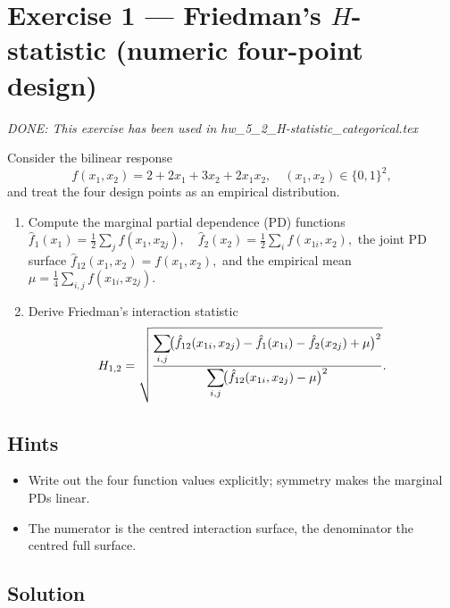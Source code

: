 \documentclass[a4paper]{article}
\begin{document}

\section*{Exercise 1 — Friedman's $H$-statistic (numeric four-point design)}
\label{ex:H_numeric}

\textit{DONE: This exercise has been used in hw\_5\_2\_H-statistic\_categorical.tex}

Consider the bilinear response
\[
f(x_1,x_2)=2+2x_1+3x_2+2x_1x_2,
\quad
(x_1,x_2)\in\{0,1\}^2,
\]
and treat the four design points as an empirical distribution.

\begin{enumerate}%
  \item Compute the marginal partial dependence (PD) functions
        \(
        \hat f_{1}(x_1)=\tfrac12\!\sum_{j}f(x_1,x_{2j}),
        \quad
        \hat f_{2}(x_2)=\tfrac12\!\sum_{i}f(x_{1i},x_2),
        \)
        the joint PD surface
        \(
        \hat f_{12}(x_1,x_2)=f(x_1,x_2),
        \)
        and the empirical mean
        \(
        \mu=\tfrac14\!\sum_{i,j}f(x_{1i},x_{2j}).
        \)
  \item Derive Friedman's interaction statistic
        \[
          H_{1,2}
          =\sqrt{%
            \frac{\displaystyle
                  \sum_{i,j}\!\bigl(
                    \hat f_{12}(x_{1i},x_{2j})-
                    \hat f_{1}(x_{1i})-
                    \hat f_{2}(x_{2j})+\mu
                  \bigr)^{2}}
                 {\displaystyle
                  \sum_{i,j}\!\bigl(
                    \hat f_{12}(x_{1i},x_{2j})-\mu
                  \bigr)^{2}}}.
        \]
\end{enumerate}

\subsection*{Hints}
\begin{itemize}
  \item Write out the four function values explicitly; symmetry makes the marginal PDs linear.
  \item The numerator is the centred interaction surface, the denominator the centred full surface.
\end{itemize}

\subsection*{Solution}
\end{document}
